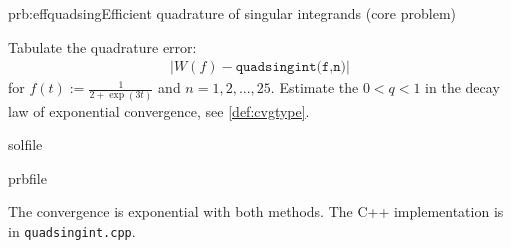 \begin{samproblem}{prb:effquadsing}{Efficient quadrature of singular integrands (core problem)}
%   
%     

\begin{subproblem}[1]
  Tabulate the quadrature error:
  \begin{align*}
    \lvert W(f) - \texttt{quadsingint(f,n)} \rvert
  \end{align*}
  for $f(t) := \frac{1}{2+\exp(3t)}$ and $n = 1,2,...,25$. 
  Estimate the $0 < q <  1$ in the decay law of exponential convergence, see \cref{def:cvgtype}. 

  \begin{samwriteprbpart}{solfile}
    \begin{writeverbatim}{prbfile}
      \begin{samsolution}
        The convergence is exponential with both methods. The C++ implementation is in \verb|quadsingint.cpp|.
      \end{samsolution}
    \end{writeverbatim}
  \end{samwriteprbpart}
\end{subproblem}
 
\end{samproblem}
